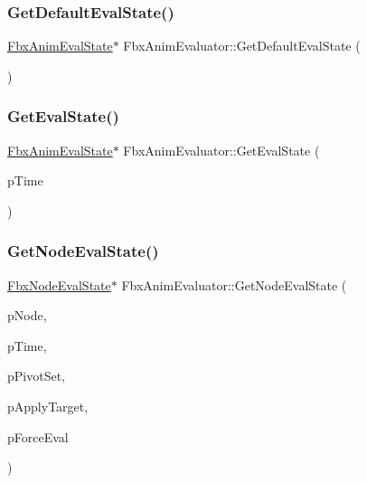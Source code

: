 \subsubsection{\texorpdfstring{Get\+Default\+Eval\+State()}{GetDefaultEvalState()}}
{\footnotesize\ttfamily \hyperlink{class_fbx_anim_eval_state}{Fbx\+Anim\+Eval\+State}$\ast$ Fbx\+Anim\+Evaluator\+::\+Get\+Default\+Eval\+State (\begin{DoxyParamCaption}{ }\end{DoxyParamCaption})\hspace{0.3cm}{\ttfamily [protected]}}

\mbox{\label{class_fbx_anim_evaluator_ae09fad8424850027d8534845dc3f950d}} 
\subsubsection{\texorpdfstring{Get\+Eval\+State()}{GetEvalState()}}
{\footnotesize\ttfamily \hyperlink{class_fbx_anim_eval_state}{Fbx\+Anim\+Eval\+State}$\ast$ Fbx\+Anim\+Evaluator\+::\+Get\+Eval\+State (\begin{DoxyParamCaption}\item[{const \hyperlink{class_fbx_time}{Fbx\+Time} \&}]{p\+Time }\end{DoxyParamCaption})\hspace{0.3cm}{\ttfamily [protected]}}

\mbox{\label{class_fbx_anim_evaluator_adf64b2948f34228e9723939c9347474c}} 
\subsubsection{\texorpdfstring{Get\+Node\+Eval\+State()}{GetNodeEvalState()}}
{\footnotesize\ttfamily \hyperlink{class_fbx_node_eval_state}{Fbx\+Node\+Eval\+State}$\ast$ Fbx\+Anim\+Evaluator\+::\+Get\+Node\+Eval\+State (\begin{DoxyParamCaption}\item[{\hyperlink{class_fbx_node}{Fbx\+Node} $\ast$}]{p\+Node,  }\item[{const \hyperlink{class_fbx_time}{Fbx\+Time} \&}]{p\+Time,  }\item[{\hyperlink{class_fbx_node_ae62b7311ac4727654cdf1ebd5cbf7343}{Fbx\+Node\+::\+E\+Pivot\+Set}}]{p\+Pivot\+Set,  }\item[{bool}]{p\+Apply\+Target,  }\item[{bool}]{p\+Force\+Eval }\end{DoxyParamCaption})\hspace{0.3cm}{\ttfamily [protected]}}

